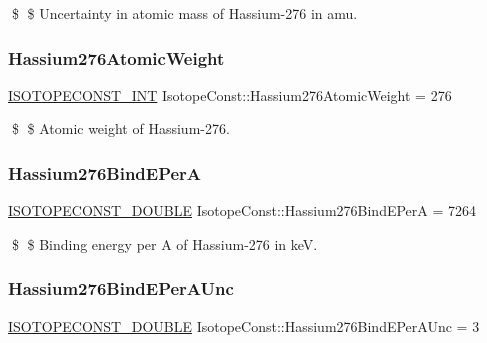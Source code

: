 \$ \$ Uncertainty in atomic mass of Hassium-\/276 in amu. \mbox{\label{group___isotope_const-_hassium-_hs276_ga74b744f56ff549f9c3c999d75818b4f7}} 
\subsubsection{\texorpdfstring{Hassium276\+Atomic\+Weight}{Hassium276AtomicWeight}}
{\footnotesize\ttfamily \mbox{\hyperlink{group___isotope_const-_macros_ga5f18360b3e99483a35c32d789e62621c}{I\+S\+O\+T\+O\+P\+E\+C\+O\+N\+S\+T\+\_\+\+I\+NT}} Isotope\+Const\+::\+Hassium276\+Atomic\+Weight = 276}

\$ \$ Atomic weight of Hassium-\/276. \mbox{\label{group___isotope_const-_hassium-_hs276_ga2efb138b9f434533d8883ff4c5ad384a}} 
\subsubsection{\texorpdfstring{Hassium276\+Bind\+E\+PerA}{Hassium276BindEPerA}}
{\footnotesize\ttfamily \mbox{\hyperlink{group___isotope_const-_macros_ga8f45a7272ce02c0b4c65c44636ed719a}{I\+S\+O\+T\+O\+P\+E\+C\+O\+N\+S\+T\+\_\+\+D\+O\+U\+B\+LE}} Isotope\+Const\+::\+Hassium276\+Bind\+E\+PerA = 7264}

\$ \$ Binding energy per A of Hassium-\/276 in keV. \mbox{\label{group___isotope_const-_hassium-_hs276_ga4e1421d0cae00aec140bdd0c3c168f16}} 
\subsubsection{\texorpdfstring{Hassium276\+Bind\+E\+Per\+A\+Unc}{Hassium276BindEPerAUnc}}
{\footnotesize\ttfamily \mbox{\hyperlink{group___isotope_const-_macros_ga8f45a7272ce02c0b4c65c44636ed719a}{I\+S\+O\+T\+O\+P\+E\+C\+O\+N\+S\+T\+\_\+\+D\+O\+U\+B\+LE}} Isotope\+Const\+::\+Hassium276\+Bind\+E\+Per\+A\+Unc = 3}

